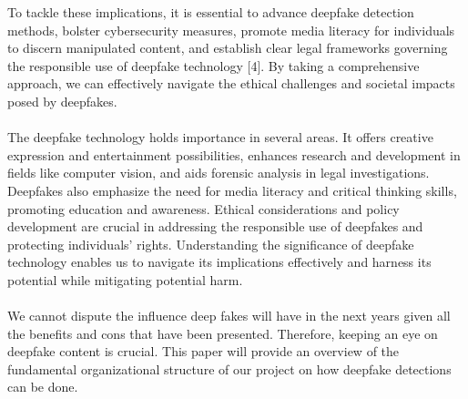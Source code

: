 To tackle these implications, it is essential to advance deepfake detection methods, bolster cybersecurity measures, promote media literacy for individuals to discern manipulated content, and establish clear legal frameworks governing the responsible use of deepfake technology [4]. By taking a comprehensive approach, we can effectively navigate the ethical challenges and societal impacts posed by deepfakes.
\\\\
The deepfake technology holds importance in several areas. It offers creative expression and entertainment possibilities, enhances research and development in fields like computer vision, and aids forensic analysis in legal investigations. Deepfakes also emphasize the need for media literacy and critical thinking skills, promoting education and awareness. Ethical considerations and policy development are crucial in addressing the responsible use of deepfakes and protecting individuals' rights. Understanding the significance of deepfake technology enables us to navigate its implications effectively and harness its potential while mitigating potential harm.
\\\\
We cannot dispute the influence deep fakes will have in the next years given all the benefits and cons that have been presented. Therefore, keeping an eye on deepfake content is crucial. This paper will provide an overview of the fundamental organizational structure of our project on how deepfake detections can be done.